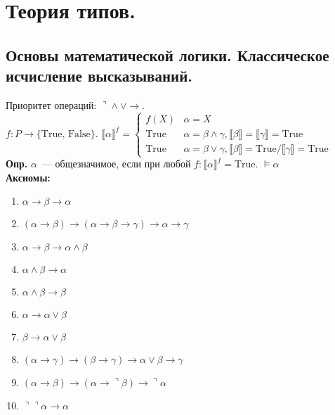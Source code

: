 \documentclass{article}
\begin{document}
	
	
	
	
	\newpage
	\section{Теория типов.}
	\subsection{Основы математической логики. Классическое исчисление высказываний.}
	Приоритет операций: $\urcorner \wedge \vee \rightarrow$. \\
	$f: P \rightarrow \{ \text{True, False} \}$. $\llbracket \alpha \rrbracket^f =
	\begin{cases}
		f(X) & \alpha = X \\
		\text{True} & \alpha = \beta \wedge \gamma, \llbracket \beta \rrbracket = \llbracket \gamma \rrbracket = \text{True} \\
		\text{True} & \alpha = \beta \vee \gamma, \llbracket \beta \rrbracket = \text{True} / \llbracket \gamma \rrbracket = \text{True}
	\end{cases}$ \\
	\textbf{Опр.} $\alpha$~--- общезначимое, если при любой $f: \llbracket \alpha \rrbracket^f = \text{True}$. $\vDash \alpha$ \\
	\textbf{Аксиомы:}
	\begin{enumerate}
		\item $\alpha \rightarrow \beta \rightarrow \alpha$
		\item $(\alpha \rightarrow \beta) \rightarrow (\alpha \rightarrow \beta \rightarrow \gamma) \rightarrow \alpha \rightarrow \gamma$
		\item $\alpha \rightarrow \beta \rightarrow \alpha \wedge \beta$
		\item $\alpha \wedge \beta \rightarrow \alpha$
		\item $\alpha \wedge \beta \rightarrow \beta$
		\item $\alpha \rightarrow \alpha \vee \beta$
		\item $\beta \rightarrow \alpha \vee \beta$
		\item $(\alpha \rightarrow \gamma) \rightarrow (\beta \rightarrow \gamma) \rightarrow \alpha \vee \beta \rightarrow \gamma$
		\item $(\alpha \rightarrow \beta) \rightarrow (\alpha \rightarrow \urcorner \beta) \rightarrow \urcorner \alpha$
		\item $\urcorner \urcorner \alpha \rightarrow \alpha$
	\end{enumerate}
\end{document}
